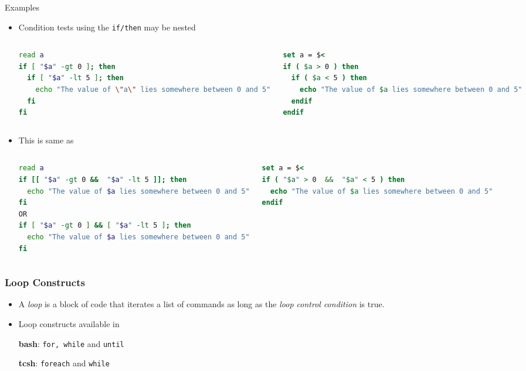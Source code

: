 \documentclass[10pt,t]{beamer}
\begin{document}
\begin{frame}[fragile]{Examples}
  \begin{itemize}
    \item Condition tests using the \texttt{if/then} may be nested
      \begin{columns}
        \begin{exampleblock}{}
      \begin{lstlisting}[language=bash]
read a
if [ "$a" -gt 0 ]; then
  if [ "$a" -lt 5 ]; then
    echo "The value of \"a\" lies somewhere between 0 and 5"
  fi
fi
      \end{lstlisting}
        \end{exampleblock}
        \begin{block}{}
      \begin{lstlisting}[language=csh]
set a = $<
if ( $a > 0 ) then
  if ( $a < 5 ) then
    echo "The value of $a lies somewhere between 0 and 5"
  endif
endif
      \end{lstlisting}
        \end{block}
      \end{columns}
    \item This is same as 
      \begin{columns}
        \begin{exampleblock}{}
      \begin{lstlisting}[language=bash]
read a
if [[ "$a" -gt 0 &&  "$a" -lt 5 ]]; then
  echo "The value of $a lies somewhere between 0 and 5"
fi
OR
if [ "$a" -gt 0 ] && [ "$a" -lt 5 ]; then
  echo "The value of $a lies somewhere between 0 and 5"
fi
      \end{lstlisting}
        \end{exampleblock}
        \begin{block}{}
      \begin{lstlisting}[language=csh]
set a = $<
if ( "$a" > 0  &&  "$a" < 5 ) then
  echo "The value of $a lies somewhere between 0 and 5"
endif
      \end{lstlisting}
        \end{block}
      \end{columns}
  \end{itemize}
\end{frame}

\begin{frame}
  \frametitle{Loop Constructs}
  \begin{itemize}
    \item A \textit{loop} is a block of code that iterates a list of commands as long as the \textit{loop control condition} is true.
    \item Loop constructs available in 
    \item[\textbf{bash}:] \texttt{for, while} and \texttt{until}
    \item[\textbf{tcsh}:] \texttt{foreach} and \texttt{while}
  \end{itemize}
\end{frame}
\end{document}
